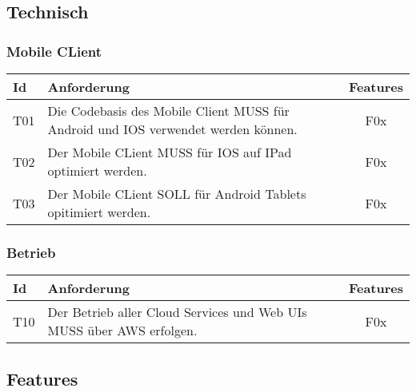 \clearpage

\subsection{Technisch}\label{subsec:technisch}


\subsubsection*{Mobile CLient}

\begin{table}[h]
    \centering
    \begin{tabular}{|l|p{13cm}|c|}
        \hline
        \textbf{Id} & \textbf{Anforderung}                                                              & \textbf{Features} \\
        \hline
        T01         & Die Codebasis des Mobile Client MUSS für Android und IOS verwendet werden können. & F0x \\
        \hline
        T02         & Der Mobile CLient MUSS für IOS auf IPad optimiert werden.                         & F0x               \\
        \hline
        T03         & Der Mobile CLient SOLL für Android Tablets opitimiert werden.                     & F0x               \\
        \hline
    \end{tabular}\label{tab:userstories3}
\end{table}

\subsubsection*{Betrieb}

\begin{table}[h]
    \centering
    \begin{tabular}{|l|p{13cm}|c|}
        \hline
        \textbf{Id} & \textbf{Anforderung}                                                 & \textbf{Features} \\
        \hline
        T10         & Der Betrieb aller Cloud Services und Web UIs MUSS über AWS erfolgen. & F0x               \\
        \hline
    \end{tabular}\label{tab:userstories4}
\end{table}

\clearpage

\subsection{Features}\label{subsec:features}

